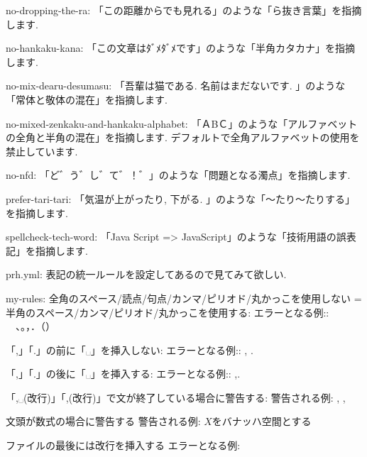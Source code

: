 no-dropping-the-ra:
「この距離からでも見れる」のような「ら抜き言葉」を指摘します. 

no-hankaku-kana:
「この文章はﾀﾞﾒﾀﾞﾒです」のような「半角カタカナ」を指摘します. 

no-mix-dearu-desumasu:
「吾輩は猫である. 名前はまだないです. 」のような「常体と敬体の混在」を指摘します. 

no-mixed-zenkaku-and-hankaku-alphabet:
「ＡBＣ」のような「アルファベットの全角と半角の混在」を指摘します. 
デフォルトで全角アルファベットの使用を禁止しています. 

no-nfd:
「ど゛う゛し゛て゛！゛」のような「問題となる濁点」を指摘します. 

prefer-tari-tari:
「気温が上がったり, 下がる. 」のような「〜たり〜たりする」を指摘します. 

spellcheck-tech-word:
「Java Script => JavaScript」のような「技術用語の誤表記」を指摘します. 

prh.yml: 表記の統一ルールを設定してあるので見てみて欲しい. 

my-rules:
全角のスペース/読点/句点/カンマ/ピリオド/丸かっこを使用しない
 = 半角のスペース/カンマ/ピリオド/丸かっこを使用する:
エラーとなる例:: 　、。，．（）

「,」「.」の前に「␣」を挿入しない:
エラーとなる例:: , . 

「,」「.」の後に「␣」を挿入する:
エラーとなる例:: ,.

「,␣(改行)」「,(改行)」で文が終了している場合に警告する:
警告される例: , 
,

文頭が数式の場合に警告する
警告される例:
$X$をバナッハ空間とする

ファイルの最後には改行を挿入する
エラーとなる例: